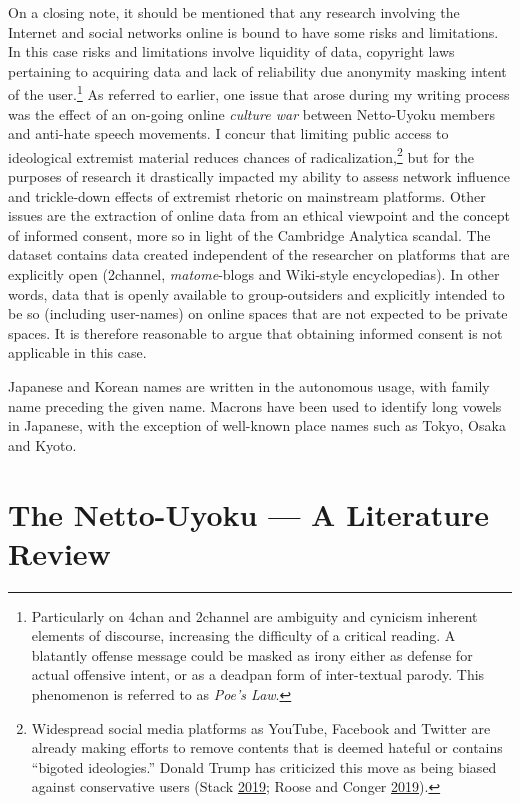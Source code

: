\documentclass[10pt,british,A4paper,,openany]{memoir}
\begin{document}
On a closing note, it should be mentioned that any research involving
the Internet and social networks online is bound to have some risks and
limitations. In this case risks and limitations involve liquidity of
data, copyright laws pertaining to acquiring data and lack of
reliability due anonymity masking intent of the user.\footnote{Particularly
  on 4chan and 2channel are ambiguity and cynicism inherent elements of
  discourse, increasing the difficulty of a critical reading. A
  blatantly offense message could be masked as irony either as defense
  for actual offensive intent, or as a deadpan form of inter-textual
  parody. This phenomenon is referred to as \emph{Poe's Law}.} As
referred to earlier, one issue that arose during my writing process was
the effect of an on-going online \emph{culture war} between Netto-Uyoku
members and anti-hate speech movements. I concur that limiting public
access to ideological extremist material reduces chances of
radicalization,\footnote{Widespread social media platforms as YouTube,
  Facebook and Twitter are already making efforts to remove contents
  that is deemed hateful or contains ``bigoted ideologies.'' Donald
  Trump has criticized this move as being biased against conservative
  users (Stack \protect\hyperlink{ref-stack_trump_2019}{2019}; Roose and
  Conger \protect\hyperlink{ref-roose_youtube_2019}{2019}).} but for the
purposes of research it drastically impacted my ability to assess
network influence and trickle-down effects of extremist rhetoric on
mainstream platforms. Other issues are the extraction of online data
from an ethical viewpoint and the concept of informed consent, more so
in light of the Cambridge Analytica scandal. The dataset contains data
created independent of the researcher on platforms that are explicitly
open (2channel, \emph{matome}-blogs and Wiki-style encyclopedias). In
other words, data that is openly available to group-outsiders and
explicitly intended to be so (including user-names) on online spaces
that are not expected to be private spaces. It is therefore reasonable
to argue that obtaining informed consent is not applicable in this case.

Japanese and Korean names are written in the autonomous usage, with
family name preceding the given name. Macrons have been used to identify
long vowels in Japanese, with the exception of well-known place names
such as Tokyo, Osaka and Kyoto.

\newpage

\chapter{The Netto-Uyoku --- A Literature
Review}\label{the-netto-uyoku-a-literature-review}
\end{document}

